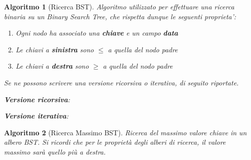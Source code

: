\documentclass[oneside]{book}
\newtheorem{alg}{Algoritmo}
\begin{document}
\begin{alg}[Ricerca BST]
  Algoritmo utilizzato per effettuare una ricerca binaria su un Binary Search Tree,
  che rispetta dunque le seguenti proprieta':
  \begin{enumerate}
    \item Ogni nodo ha associato una \textbf{chiave} e un campo \textbf{data}
    \item Le chiavi a \textbf{sinistra} sono $\leq$ a quella del nodo padre
    \item Le chiavi a \textbf{destra} sono $\geq$ a quella del nodo padre
  \end{enumerate}
  Se ne possono scrivere una versione ricorsiva o iterativa, di seguito riportate.

  \textbf{Versione ricorsiva}: \\
  \begin{algorithm}[H]

  \end{algorithm}

  \textbf{Versione iterativa}: \\
  \begin{algorithm}[H]

  \end{algorithm}
\end{alg}

\begin{alg}[Ricerca Massimo BST]
  Ricerca del massimo valore chiave in un albero BST. Si ricordi che per le
  propriet\`a degli alberi di ricerca, il valore massimo sar\`a quello pi\`u a destra.

  \begin{algorithm}[H]

  \end{algorithm}
\end{alg}
\end{document}
